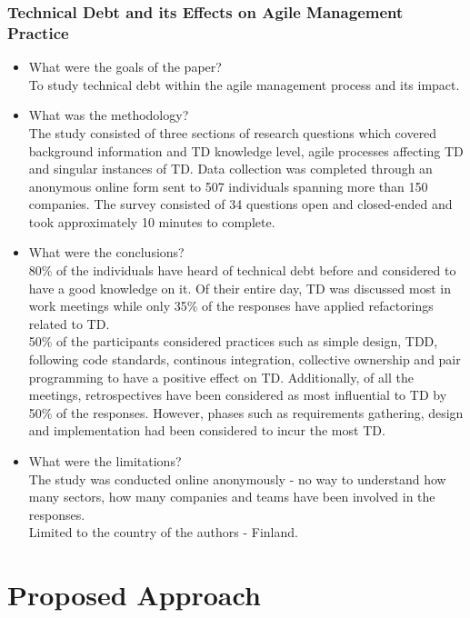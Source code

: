 \documentclass{mprop}
\begin{document}
\subsubsection{Technical Debt and its Effects on Agile Management Practice} \cite{Holvitie2014}
\begin{itemize}
\item What were the goals of the paper? \\
To study technical debt within the agile management process and its impact.
\item What was the methodology? \\
The study consisted of three sections of research questions which covered background information and TD knowledge level, agile processes affecting TD and singular instances of TD.
Data collection was completed through an anonymous online form sent to 507 individuals spanning more than 150 companies.
The survey consisted of 34 questions open and closed-ended and took approximately 10 minutes to complete.
\item What were the conclusions? \\
80\% of the individuals have heard of technical debt before and considered to have a good knowledge on it.
Of their entire day, TD was discussed most in work meetings while only 35\% of the responses have applied refactorings related to TD.\\
50\% of the participants considered practices such as simple design, TDD, following code standards, continous integration, collective ownership and pair programming to have a positive effect on TD.
Additionally, of all the meetings, retrospectives have been considered as most influential to TD by 50\% of the responses.
However, phases such as requirements gathering, design and implementation had been considered to incur the most TD.
\item What were the limitations? \\
The study was conducted online anonymously - no way to understand how many sectors, how many companies and teams have been involved in the responses.\\
Limited to the country of the authors - Finland.
\end{itemize}

\section{Proposed Approach}
\end{document}

